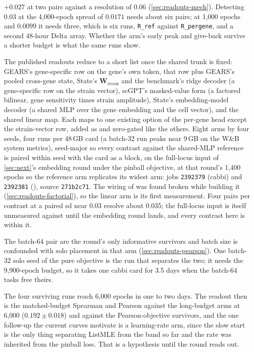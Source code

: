  $+0.027$ at
two pairs against a resolution of $0.06$ (\cref{sec:readouts-mech}). Detecting $0.03$ at
the 4{,}000-epoch spread of $0.0171$ needs about six pairs; at 1{,}000 epochs and
$0.0099$ it needs three, which is six runs, \texttt{R\_ref} against \texttt{R\_pergene},
and a second 48-hour Delta array. Whether the arm's early peak and give-back survive a
shorter budget is what the same runs show.

 The published readouts reduce to
a short list once the shared trunk is fixed: GEARS's gene-specific row on the gene's own
token, that row plus GEARS's pooled cross-gene state, State's $\mathbf W_{\mathrm{recon}}$
and the benchmark's ridge decoder (a gene-specific row on the strain vector), scGPT's
masked-value form (a factored bilinear, gene sensitivity times strain amplitude), State's
embedding-model decoder (a shared MLP over the gene embedding and the cell vector), and
the shared linear map. Each maps to one existing option of the per-gene head except the
strain-vector row, added as  and zero-gated like the others. Eight
arms by four seeds, four runs per 48\,GB card (a batch-32 run peaks near 9\,GB on the
W\&B system metrics), seed-major so every contrast against the shared-MLP reference is
paired within seed with the card as a block, on the full-locus input of \cref{sec:next}'s
embedding round under the pinball objective, at that round's 1{,}400 epochs so the
reference arm replicates its widest arm: jobs \texttt{2392379} (cabbi) and
\texttt{2392381} (), source \texttt{271b2c71}. The wiring of
 was found broken while building it (\cref{sec:readouts-factorial}),
so the linear arm is its first measurement. Four pairs per contrast at a paired sd near
$0.03$ resolve about $0.035$; the full-locus input is itself unmeasured against
 until the embedding round lands, and every contrast here is within it.

 The
batch-64 pair are the round's only informative survivors and batch size is confounded
with solo placement in that arm (\cref{sec:readouts-pearson}). One batch-32 solo seed of
the pure objective is the run that separates the two; it needs the 9{,}900-epoch budget,
so it takes one cabbi card for 3.5 days when the batch-64 tasks free theirs.

 The four surviving runs reach 6{,}000 epochs in
one to two days. The readout then is the matched-budget Spearman and Pearson against the
long-budget arms at 6{,}000 ($0.192 \pm 0.018$) and against the Pearson-objective
survivors, and the one follow-up the current curves motivate is a learning-rate arm,
since the slow start is the only thing separating ListMLE from the band so far and the
rate was inherited from the pinball loss. That is a hypothesis until the round reads out.

